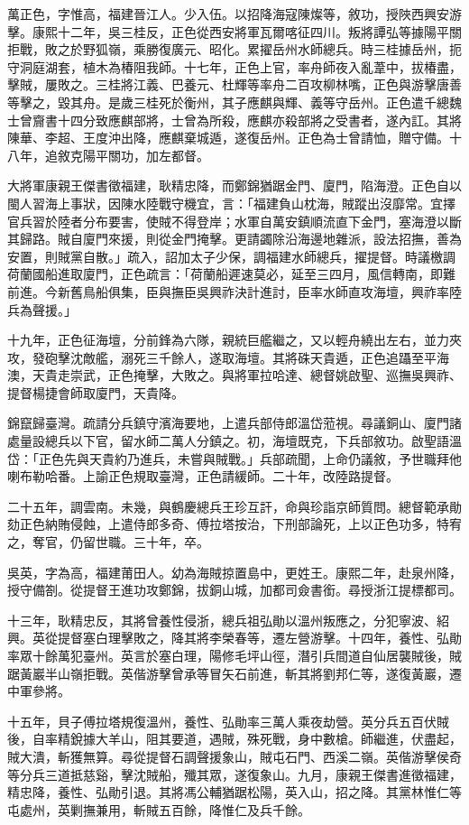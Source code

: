\begin{pinyinscope}
萬正色，字惟高，福建晉江人。少入伍。以招降海寇陳燦等，敘功，授陜西興安游擊。康熙十二年，吳三桂反，正色從西安將軍瓦爾喀征四川。叛將譚弘等據陽平關拒戰，敗之於野狐嶺，乘勝復廣元、昭化。累擢岳州水師總兵。時三桂據岳州，扼守洞庭湖套，植木為椿阻我師。十七年，正色上官，率舟師夜入亂葦中，拔椿盡，擊賊，屢敗之。三桂將江義、巴養元、杜輝等率舟二百攻柳林嘴，正色與游擊唐善等擊之，毀其舟。是歲三桂死於衡州，其子應麒與輝、義等守岳州。正色遣千總魏士曾齎書十四分致應麒部將，士曾為所殺，應麒亦殺部將之受書者，遂內訌。其將陳華、李超、王度沖出降，應麒棄城遁，遂復岳州。正色為士曾請恤，贈守備。十八年，追敘克陽平關功，加左都督。

大將軍康親王傑書徵福建，耿精忠降，而鄭錦猶踞金門、廈門，陷海澄。正色自以閩人習海上事狀，因陳水陸戰守機宜，言：「福建負山枕海，賊蹤出沒靡常。宜擇官兵習於陸者分布要害，使賊不得登岸；水軍自萬安鎮順流直下金門，塞海澄以斷其歸路。賊自廈門來援，則從金門掩擊。更請蠲除沿海邊地雜派，設法招撫，善為安置，則賊黨自散。」疏入，詔加太子少保，調福建水師總兵，擢提督。時議檄調荷蘭國船進取廈門，正色疏言：「荷蘭船遲速莫必，延至三四月，風信轉南，即難前進。今新舊鳥船俱集，臣與撫臣吳興祚決計進討，臣率水師直攻海壇，興祚率陸兵為聲援。」

十九年，正色征海壇，分前鋒為六隊，親統巨艦繼之，又以輕舟繞出左右，並力夾攻，發砲擊沈敵艦，溺死三千餘人，遂取海壇。其將硃天貴遁，正色追躡至平海澳，天貴走崇武，正色掩擊，大敗之。與將軍拉哈達、總督姚啟聖、巡撫吳興祚、提督楊捷會師取廈門，天貴降。

錦竄歸臺灣。疏請分兵鎮守濱海要地，上遣兵部侍郎溫岱蒞視。尋議銅山、廈門諸處量設總兵以下官，留水師二萬人分鎮之。初，海壇既克，下兵部敘功。啟聖語溫岱：「正色先與天貴約乃進兵，未嘗與賊戰。」兵部疏聞，上命仍議敘，予世職拜他喇布勒哈番。上諭正色規取臺灣，正色請緩師。二十年，改陸路提督。

二十五年，調雲南。未幾，與鶴慶總兵王珍互訐，命與珍詣京師質問。總督範承勛劾正色納賄侵蝕，上遣侍郎多奇、傅拉塔按治，下刑部論死，上以正色功多，特宥之，奪官，仍留世職。三十年，卒。

吳英，字為高，福建莆田人。幼為海賊掠置島中，更姓王。康熙二年，赴泉州降，授守備劄。從提督王進功攻鄭錦，拔銅山城，加都司僉書銜。尋授浙江提標都司。

十三年，耿精忠反，其將曾養性侵浙，總兵祖弘勛以溫州叛應之，分犯寧波、紹興。英從提督塞白理擊敗之，降其將李榮春等，遷左營游擊。十四年，養性、弘勛率眾十餘萬犯臺州。英言於塞白理，陽修毛坪山徑，潛引兵間道自仙居襲賊後，賊踞黃巖半山嶺拒戰。英偕游擊曾承等冒矢石前進，斬其將劉邦仁等，遂復黃巖，遷中軍參將。

十五年，貝子傅拉塔規復溫州，養性、弘勛率三萬人乘夜劫營。英分兵五百伏賊後，自率精銳據大羊山，阻其要道，遇賊，殊死戰，身中數槍。師繼進，伏盡起，賊大潰，斬獲無算。尋從提督石調聲援象山，賊屯石門、西溪二嶺。英偕游擊侯奇等分兵三道抵慈谿，擊沈賊船，殲其眾，遂復象山。九月，康親王傑書進徵福建，精忠降，養性、弘勛引退。其將馮公輔猶踞松陽，英入山，招之降。其黨林惟仁等屯處州，英剿撫兼用，斬賊五百餘，降惟仁及兵千餘。


\end{pinyinscope}

